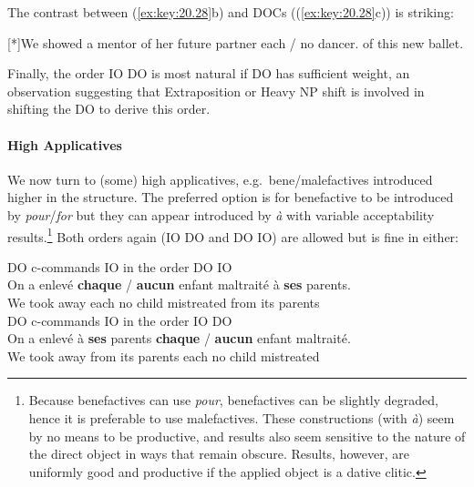 \documentclass[output=paper]{langsci/langscibook}
\begin{document}
The contrast between  (\ref{ex:key:20.28}b) and 
\glspl{DOC} ((\ref{ex:key:20.28}c)) is striking:

\begin{exe}
    \exi{\eqref{ex:key:20.28}}
    \begin{xlist}
    [*]{We {} showed  a mentor of her future partner each / no dancer.\glossF{} of this new ballet.}
    \end{xlist}
\end{exe}
%
Finally, the order IO DO is most natural if DO has sufficient weight, an
observation suggesting that Extraposition or Heavy NP shift is involved in
shifting the DO to derive this order.

\paragraph*{High Applicatives} We now turn to (some) high applicatives, e.g.\
bene/male\-factives introduced higher in the structure. The preferred option is
for benefactive to be introduced by \emph{pour}/\emph{for} but they can appear
introduced by \emph{à} with variable acceptability results.\footnote{Because
    benefactives can use {\it pour}, benefactives can be slightly degraded,
    hence it is preferable to use malefactives. These constructions (with
    \emph{à}) seem by no means to be productive, and results also seem
    sensitive to the nature of the direct object in ways that remain obscure.
    Results, however, are uniformly good and productive if the applied object
is a dative\is{dative case} clitic.} Both orders again (IO DO and DO IO) are
allowed but \isi{binding} is fine in either:

\ea \label{doio25}
\ea  DO c-commands IO in the order DO IO\\
\gll On {a enlev\'{e}} \textbf{chaque} / \textbf{aucun} enfant maltrait\'e
\`{a} {\bf ses} parents.\\
We {took away} each {} no child mistreated from its parents\\
\ex  DO c-commands IO in the order IO DO\\
\gll On {a enlev\'{e}} \`{a} {\bf ses} parents \textbf{chaque} / \textbf{aucun} enfant maltrait\'e.\\
We {took away} from its parents each {} no child mistreated\\
\z
\z
\end{document}
